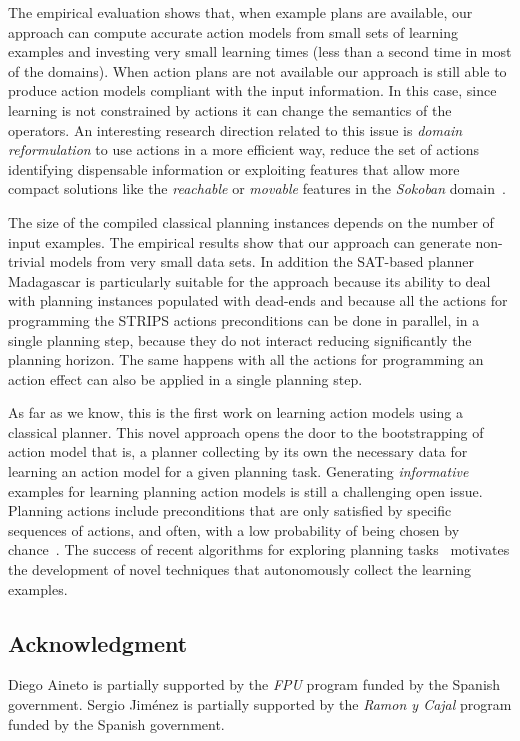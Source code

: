 \documentclass[letterpaper]{article} %
\begin{document}
The empirical evaluation shows that, when example plans are available, our approach can compute accurate action models from small sets of learning examples and investing very small learning times (less than a second time in most of the domains). When action plans are not available our approach is still able to produce action models compliant with the input information. In this case, since learning is not constrained by actions it can change the semantics of the operators. An interesting research direction related to this issue is {\em domain reformulation} to use actions in a more efficient way, reduce the set of actions identifying dispensable information or exploiting features that allow more compact solutions like the {\em reachable} or {\em movable} features in the {\em Sokoban} domain~\cite{haslum:axiomsoptimal:ijcai15}.

The size of the compiled classical planning instances depends on the number of input examples. The empirical results show that our approach can generate non-trivial models from very small data sets. In addition the SAT-based planner {\sc Madagascar} is particularly suitable for the approach because its ability to deal with planning instances populated with dead-ends and because all the actions for programming the STRIPS actions preconditions can be done in parallel, in a single planning step, because they do not interact reducing significantly the planning horizon. The same happens with all the actions for programming an action effect can also be applied in a single planning step.

As far as we know, this is the first work on learning action models using a classical planner. This novel approach opens the door to the bootstrapping of action model that is, a planner collecting by its own the necessary data for learning an action model for a given planning task. Generating {\em informative} examples for learning planning action models is still a challenging open issue. Planning actions include preconditions that are only satisfied by specific sequences of actions, and often, with a low probability of being chosen by chance~\cite{fern2004learning}. The success of recent algorithms for exploring planning tasks~\cite{geffner:novelty:IJCAI17} motivates the development of novel techniques that autonomously collect the learning examples.

\begin{small}
\subsection*{Acknowledgment}
Diego Aineto is partially supported by the {\it FPU} program funded by the Spanish government. Sergio Jim\'enez is partially supported by the {\it Ramon y Cajal} program funded by the Spanish government.
\end{small}





\end{document}
